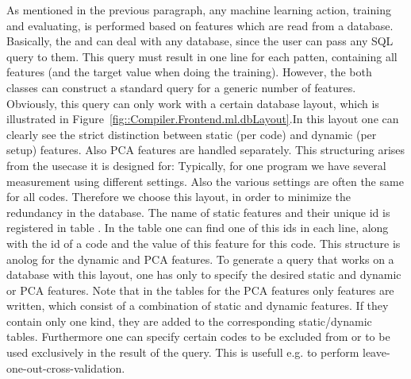 As mentioned in the previous paragraph, any machine learning action, training and evaluating, is performed based on features which are read from a database. Basically, the  and  can deal with any database, since the user can pass any SQL query to them. This query must result in one line for each patten, containing all features (and the target value when doing the training). However, the both classes can construct a standard query for a generic number of features. Obviously, this query can only work with a certain database layout, which is illustrated in Figure~\ref{fig::Compiler.Frontend.ml.dbLayout}.In this layout one can clearly see the strict distinction between static (per code) and dynamic (per setup) features. Also PCA features are handled separately. This structuring arises from the usecase it is designed for: Typically, for one program we have several measurement using different settings. Also the various settings are often the same for all codes. Therefore we choose this layout, in order to minimize the redundancy in the database. The name of static features and their unique id is registered in table . In the table  one can find one of this ids in each line, along with the id of a code and the value of this feature for this code. This structure is anolog for the dynamic and PCA features. To generate a query that works on a database with this layout, one has only to specify the desired static and dynamic or PCA features. Note that in the tables for the PCA features only features are written, which consist of a combination of static and dynamic features. If they contain only one kind, they are added to the corresponding static/dynamic tables. Furthermore one can specify certain codes to be excluded from or to be used exclusively in the result of the query. This is usefull e.g. to perform leave-one-out-cross-validation.

